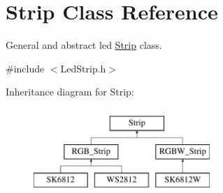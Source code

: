 \hypertarget{classStrip}{}\section{Strip Class Reference}
\label{classStrip}


General and abstract led \mbox{\hyperlink{classStrip}{Strip}} class.  




{\ttfamily \#include $<$Led\+Strip.\+h$>$}

Inheritance diagram for Strip\+:\begin{figure}[H]
\begin{center}
\leavevmode
\includegraphics[height=3.000000cm]{classStrip}
\end{center}
\end{figure}
